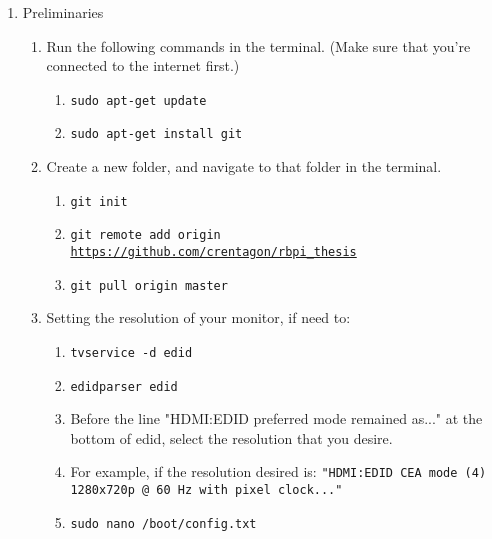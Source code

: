 \begin{enumerate}
\item Preliminaries
        \begin{enumerate}[label*=\arabic*.]
            \item Run the following commands in the terminal. (Make sure that you're connected to the internet first.)
                \begin{enumerate}[label*=\arabic*.]
                    \item \texttt{sudo apt-get update}
                    \item \texttt{sudo apt-get install git}
                \end{enumerate}
            
            \item Create a new folder, and navigate to that folder in the terminal.
                \begin{enumerate}[label*=\arabic*.]
                    \item \texttt{git init}
                    \item \texttt{git remote add origin \url{https://github.com/crentagon/rbpi_thesis}}
                    \item \texttt{git pull origin master}
                \end{enumerate}
                
            \item Setting the resolution of your monitor, if need to:
                \begin{enumerate}[label*=\arabic*.]
                    \item \texttt{tvservice -d edid}
                    \item \texttt{edidparser edid}
                    \item Before the line "HDMI:EDID preferred mode remained as..." at the bottom of edid, select the resolution that you desire.
                    \item For example, if the resolution desired is: \texttt{"HDMI:EDID CEA mode (4) 1280x720p @ 60 Hz with pixel clock..."}
                    
                    \item \texttt{sudo nano /boot/config.txt}
                    

\end{enumerate}
\end{enumerate}
\end{enumerate}

